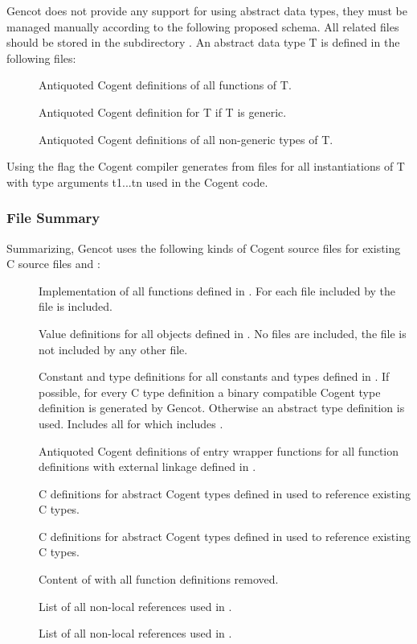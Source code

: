 Gencot does not provide any support for using abstract data types, they must be managed manually according to the following
proposed schema. All related files should be stored in the subdirectory .
An abstract data type T is defined in the following files:
\begin{description}
\item[] Antiquoted Cogent definitions of all functions of T. 
\item[] Antiquoted Cogent definition for T if T is generic.
\item[] Antiquoted Cogent definitions of all non-generic types of T.
\end{description}
Using the flag  the Cogent compiler generates from  files  for all 
instantiations of T with type arguments t1...tn used in the Cogent code.

\subsubsection{File Summary}

Summarizing, Gencot uses the following kinds of Cogent source files for existing C source files  and :
\begin{description}
\item[] Implementation of all functions defined in . For each file  included by
   the file  is included.
\item[] Value definitions for all objects defined in . No files are included, the file is not
  included by any other file.
\item[] Constant and type definitions for all constants and types defined in . 
  If possible, for every C type definition a binary compatible Cogent type 
  definition is generated by Gencot. Otherwise an abstract type definition is used. Includes
  all  for which  includes .
\item[] Antiquoted Cogent definitions of entry wrapper functions for all function definitions with external linkage
  defined in .
\item[] C definitions for abstract Cogent types defined in  used to reference existing C types.
\item[] C definitions for abstract Cogent types defined in  used to reference existing C types.
\item[] Content of  with all function definitions removed.
\item[] List of all non-local references used in .
\item[] List of all non-local references used in .
\end{description}

